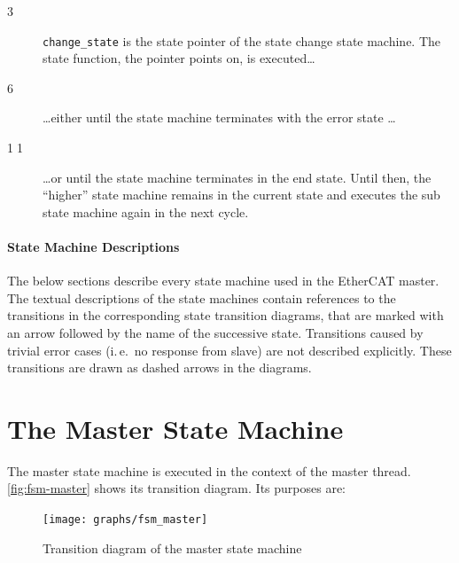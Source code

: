\documentclass[a4paper,12pt,BCOR6mm,bibtotoc,idxtotoc]{scrbook}
\newcommand{\linenum}[1]{\normalfont\textcircled{\tiny #1}}
\begin{document}
\begin{description}

\item[\linenum{3}] \lstinline+change_state+ is the state pointer of the state
change state machine. The state function, the pointer points on, is
executed\ldots

\item[\linenum{6}] \ldots either until the state machine terminates with the
error state \ldots

\item[\linenum{11}] \ldots or until the state machine terminates in the end
state. Until then, the ``higher'' state machine remains in the current state
and executes the sub state machine again in the next cycle.

\end{description}

\paragraph{State Machine Descriptions}

The below sections describe every state machine used in the EtherCAT master.
The textual descriptions of the state machines contain references to the
transitions in the corresponding state transition diagrams, that are marked
with an arrow followed by the name of the successive state. Transitions caused
by trivial error cases (i.\,e.\ no response from slave) are not described
explicitly. These transitions are drawn as dashed arrows in the diagrams.


\section{The Master State Machine}
\label{sec:fsm-master}

The master state machine is executed in the context of the master thread.
\autoref{fig:fsm-master} shows its transition diagram. Its purposes are:

\begin{figure}[htbp]
  \centering
  \texttt{[image: graphs/fsm\_master]}
  \caption{Transition diagram of the master state machine}
  \label{fig:fsm-master}
\end{figure}
\end{document}
